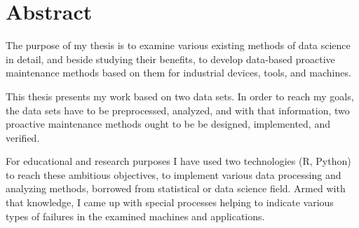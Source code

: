 \chapter*{Abstract}

The purpose of my thesis is to examine various existing methods of data science in detail, and beside studying their benefits, to develop data-based proactive maintenance methods based on them for industrial devices, tools, and machines.

This thesis presents my work based on two data sets. In order to reach my goals, the data sets have to be preprocessed, analyzed, and with that information, two proactive maintenance methods ought to be be designed, implemented, and verified.

For educational and research purposes I have used two technologies (R, Python) to reach these ambitious objectives, to implement various data processing and analyzing methods, borrowed from statistical or data science field. Armed with that knowledge, I came up with special processes helping to indicate various types of failures in the examined machines and applications.
